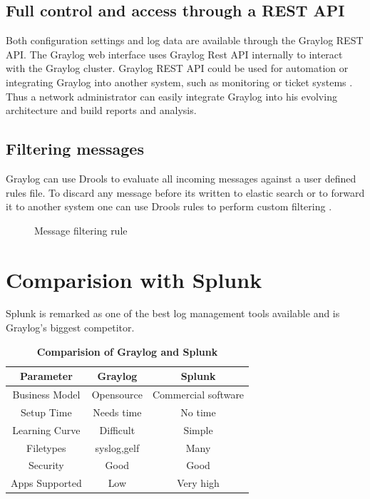 \documentclass[9pt,twocolumn,twoside]{../../styles/osajnl}
\begin{document}
\subsection{Full control and access through a REST API}

Both configuration settings and log data are available through the
Graylog REST API.  The Graylog web interface uses Graylog Rest API
internally to interact with the Graylog cluster. Graylog REST API
could be used for automation or integrating Graylog into another
system, such as monitoring or ticket systems
\cite{www-graylog-restapi}. Thus a network administrator can easily
integrate Graylog into his evolving architecture and build reports and
analysis.

\subsection{Filtering messages}

Graylog can use Drools to evaluate all incoming messages against a
user defined rules file. To discard any message before its written to
elastic search or to forward it to another system one can use Drools
rules to perform custom filtering \cite{www-graylog-blacklisting}.

\begin{figure}[htbp]
\centering
{}
\caption{\cite{www-graylog-blacklisting} Message filtering rule }
\label{fig:Sample filtering rule}
\end{figure}


\section{Comparision with Splunk}
Splunk is remarked as one of the best log management tools available
and is Graylog's biggest competitor.
\newline
\begin{table}[htbp]
\centering
\caption{\bf Comparision of Graylog and Splunk}
\begin{tabular}{ccc}
\hline
Parameter & Graylog & Splunk \\
\hline
Business Model& Opensource & Commercial software \\
Setup Time & Needs time & No time\\
Learning Curve & Difficult & Simple\\
Filetypes & syslog,gelf & Many\\
Security & Good & Good\\
Apps Supported & Low & Very high\\
\hline
\end{tabular}
  \label{tab:shape-functions}
\end{table}
\end{document}
